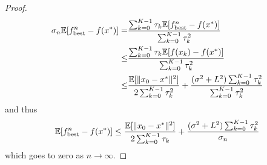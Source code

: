\begin{proof}
    \begin{equation}
        \begin{aligned}
            \sigma_n \mathbb{E}[f^n_{\mathrm{best}}-f(x^*)]
            =& \frac{\sum_{k=0}^{K-1}\tau_k\mathbb{E}[f^n_{\mathrm{best}}-f(x^*)]}{\sum_{k=0}^{K-1}\tau_k^2}\\
            \leq& \frac{\sum_{k=0}^{K-1}\tau_k\mathbb{E}[f(x_k)-f(x^*)]}{\sum_{k=0}^{K-1}\tau_k^2}\\
            \leq& \frac{\mathbb{E}[\|x_{0}-x^*\|^2]}{2\sum_{k=0}^{K-1}\tau_k^2} + \frac{(\sigma^2 + L^2)\sum_{k=0}^{K-1}\tau_k^2}{\sum_{k=0}^{K-1}\tau_k^2}\\
        \end{aligned}
    \end{equation}
    and thus
    \begin{equation}
        \mathbb{E}[f^n_{\mathrm{best}}-f(x^*)] \leq \frac{\mathbb{E}[\|x_{0}-x^*\|^2]}{2\sum_{k=0}^{K-1}\tau_k} + \frac{(\sigma^2 + L^2)\sum_{k=0}^{K-1}\tau_k^2}{\sigma_n}
    \end{equation}
    which goes to zero as $n\rightarrow\infty$.
\end{proof}